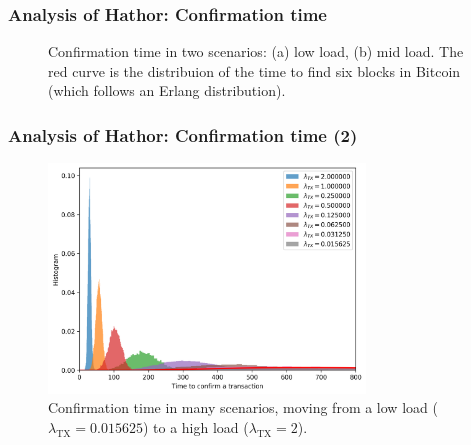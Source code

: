 \documentclass{beamer}
\begin{document}
\begin{frame}
\frametitle{Analysis of Hathor: Confirmation time}
\begin{figure}
\centering
{}

\caption{Confirmation time in two scenarios: (a) low load, (b) mid load. The red curve is the distribuion of the time to find six blocks in Bitcoin (which follows an Erlang distribution).}
\end{figure}
\end{frame}


\begin{frame}
\frametitle{Analysis of Hathor: Confirmation time (2)}
\begin{figure}
\includegraphics[width=0.75\textwidth]{./images01/sim/tct-many-loads-2.png}

\caption{Confirmation time in many scenarios, moving from a low load ($\lambda_\text{TX} = 0.015625$) to a high load ($\lambda_\text{TX} = 2$). \label{fig:hathor-tct-many}}
\end{figure}
\end{frame}
\end{document}
